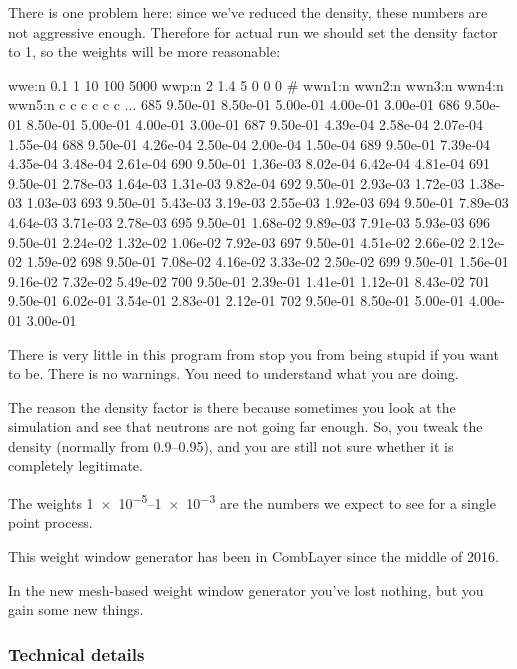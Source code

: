 There is one problem here: since we've reduced the density, these numbers are not aggressive enough.
Therefore for actual run we should set the density factor to 1, so the weights will be more reasonable:
\begin{deck}
wwe:n 0.1 1 10 100 5000
wwp:n 2 1.4 5 0 0 0
#   wwn1:n  wwn2:n  wwn3:n  wwn4:n  wwn5:n
c   c        c        c        c        c
...
685   9.50e-01 8.50e-01 5.00e-01 4.00e-01 3.00e-01
686   9.50e-01 8.50e-01 5.00e-01 4.00e-01 3.00e-01
687   9.50e-01 4.39e-04 2.58e-04 2.07e-04 1.55e-04
688   9.50e-01 4.26e-04 2.50e-04 2.00e-04 1.50e-04
689   9.50e-01 7.39e-04 4.35e-04 3.48e-04 2.61e-04
690   9.50e-01 1.36e-03 8.02e-04 6.42e-04 4.81e-04
691   9.50e-01 2.78e-03 1.64e-03 1.31e-03 9.82e-04
692   9.50e-01 2.93e-03 1.72e-03 1.38e-03 1.03e-03
693   9.50e-01 5.43e-03 3.19e-03 2.55e-03 1.92e-03
694   9.50e-01 7.89e-03 4.64e-03 3.71e-03 2.78e-03
695   9.50e-01 1.68e-02 9.89e-03 7.91e-03 5.93e-03
696   9.50e-01 2.24e-02 1.32e-02 1.06e-02 7.92e-03
697   9.50e-01 4.51e-02 2.66e-02 2.12e-02 1.59e-02
698   9.50e-01 7.08e-02 4.16e-02 3.33e-02 2.50e-02
699   9.50e-01 1.56e-01 9.16e-02 7.32e-02 5.49e-02
700   9.50e-01 2.39e-01 1.41e-01 1.12e-01 8.43e-02
701   9.50e-01 6.02e-01 3.54e-01 2.83e-01 2.12e-01
702   9.50e-01 8.50e-01 5.00e-01 4.00e-01 3.00e-01
\end{deck}

There is very little in this program from stop you from being stupid if you want to be.
There is no warnings. You need to understand what you are doing.

The reason the density factor is there because sometimes you look at the simulation and see that neutrons are not going far enough.
So, you tweak the density (normally from \numrange{0.9}{0.95}), and you are still not sure whether it is completely legitimate.

The weights \numrange[retain-unity-mantissa=false, range-phrase=\ --\ ]{1e-5}{1e-3} are the numbers we expect to see for a single point process.

This weight window generator has been in CombLayer since the middle of 2016.

\bigskip

In the new mesh-based weight window generator you've lost nothing, but you gain some new things.


\subsubsection{Technical details}

